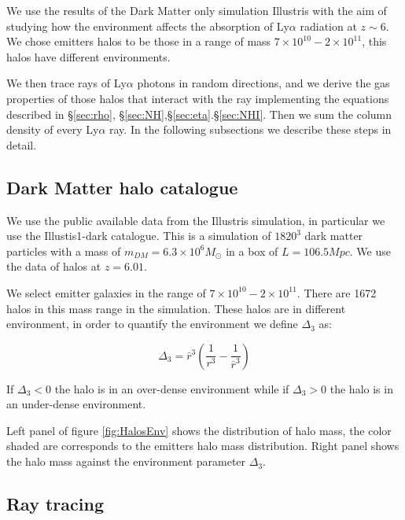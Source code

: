 \documentclass[12pt]{article}
\begin{document}
We use the results of the Dark Matter only simulation Illustris with the aim
of studying how the environment affects the absorption of
Ly$\alpha$ radiation at $z\sim6$. We chose emitters halos to be
those in a range of mass  $7 \times 10^{10} - 2 \times 10^{11}$, this
halos have different environments.


We then trace rays of Ly$\alpha$ photons in random directions, and we derive
the gas properties of those halos that interact with the ray
implementing the equations described in \S \ref{sec:rho},
\S \ref{sec:NH},\S \ref{sec:eta}.\S \ref{sec:NHI}. Then we sum the column
density of every Ly$\alpha$ ray. In the following subsections we describe
these steps in detail.

\subsection{Dark Matter halo catalogue}

We use the public available data from the Illustris simulation, in particular we use
the Illustis1-dark catalogue. This is a simulation of $1820^3$ dark matter particles
with a mass of $m_{DM}=6.3 \times 10^6 M_{\odot}$ in a box of $L=106.5 Mpc$. We use
the data of halos at $z = 6.01$.

We select emitter galaxies in the range of $7 \times 10^{10} - 2 \times 10^{11}$.
There are 1672 halos in this mass range in the simulation. These halos
are in different environment, in order to quantify the environment we
define $\Delta_3$ as:

\begin{equation}
\Delta_3  = \bar{r}^3 \left( \dfrac{1}{r^3} - \dfrac{1}{\bar{r}^3} \right)
\end{equation}

If $\Delta_3 < 0 $ the halo is in an over-dense environment while
if $\Delta_3 > 0 $ the halo is in an under-dense environment.

Left panel of figure \ref{fig:HalosEnv} shows the distribution of
halo mass, the color shaded are corresponds to the emitters halo mass
distribution. Right panel shows the halo mass against the
environment parameter $\Delta_3$.

\subsection{Ray tracing}
\end{document}
